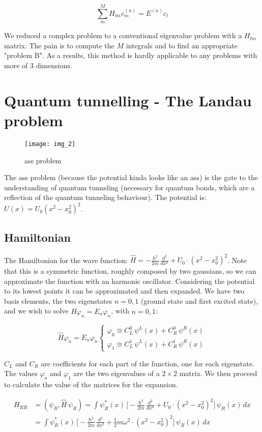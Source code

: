 		$$\sum_{m}^{M}H_{lm}c_m^{(n)}=E^{(n)}c_l$$

		We reduced a complex problem to a conventional eigenvalue problem with a $H_{lm}$ matrix.
		The pain is to compute the $M$ integrals and to find an appropriate "problem B".
		As a results, this method is hardly applicable to any problems with more of 3 dimensions.

\section{Quantum tunnelling - The Landau problem}

\begin{figure}[htbp!]
	\centering
	\texttt{[image: img\_2]}
	\label{fig:ass}
	\caption{ass problem}
\end{figure}

The ass problem (because the potential kinda looks like an ass) is the gate to the understanding of quantum tunneling (necessary for quantum bonds, which are a reflection of the quantum tunneling behaviour).
The potential is: $U(x)=U_0(x^2-x_0^2)^2$.

	\subsection{Hamiltonian}
The Hamiltonian for the wave function: $\hat{H}=-\frac{\hbar^2}{2m}\,\frac{d^2}{dx^2}+U_0\cdot(x^2-x_0^2)^2$.
Note that this is a symmetric function, roughly composed by two gaussians, so we can approximate the function with an harmonic oscillator.
Considering the potential to its lowest points it can be approximated and then expanded.
We have two basis elements, the two eigenstates $n=0,1$ (ground state and first excited state), and we wish to solve $\hat{H}\varphi_n=E_n\varphi_n$, with $n=0,1$:

$$\hat{H}\varphi_n=E_n\varphi_n\begin{cases}\varphi_0 \cong C_L^0\,\psi^L(x)+C_R^0\,\psi^R(x)\\\varphi_1 \cong C_L^1\,\psi^L(x)+C_R^1\,\psi^R(x)\end{cases}$$

$C_L$ and $C_R$ are coefficients for each part of the function, one for each eigenstate.
The values $\varphi_o$ and $\varphi_1$ are the two eigenvalues of a $2 \times 2 $ matrix.
We then proceed to calculate the value of the matrices for the expansion.

\begin{align*}H_{RR}&=(\psi_R,\hat{H}\,\psi_R)= \int\psi_R^*(x)\,\bigg[-\frac{\hbar^2}{2m}\,\frac{d^2}{dx^2}+U_0\cdot(x^2-x_0^2)^2\bigg]\,\psi_R(x)\,dx\\
&=\int\psi_R^*(x)\,\bigg[-\frac{\hbar^2}{2m}\,\frac{d^2}{dx^2}+\frac{1}{2}m\omega^2\cdot(x^2-x_0^2)^2\bigg]\,\psi_R(x)\,dx
\end{align*}

